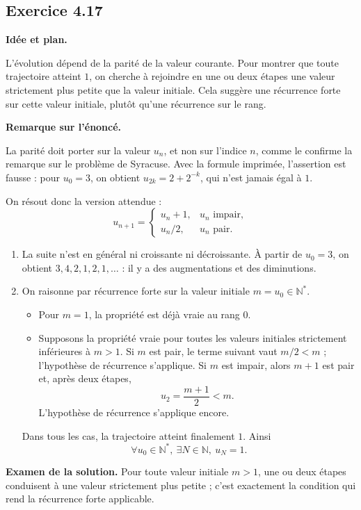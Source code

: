 \documentclass[11pt,a4paper]{article}
\newcommand{\N}{\mathbb N}
\newcommand{\1}{\mathbf 1}
\newenvironment{corrige}[1]{%
  \Needspace{5\baselineskip}%
  \subsection*{Exercice #1}%
  \addcontentsline{toc}{subsection}{Exercice #1}%
}{\medskip}
\newenvironment{coquille}{%
  \begin{center}\begin{minipage}{0.94\linewidth}
  \color{MATred}\textbf{Remarque sur l'énoncé.}\enspace
}{%
  \end{minipage}\end{center}
}
\newenvironment{methode}{%
  \begin{center}\begin{minipage}{0.94\linewidth}
  \color{MATblue}\textbf{Idée et plan.}\enspace
}{%
  \end{minipage}\end{center}
}
\begin{document}
\begin{corrige}{4.17}
\begin{methode}
L'évolution dépend de la parité de la valeur courante. Pour montrer que toute trajectoire atteint $1$, on cherche à rejoindre en une ou deux étapes une valeur strictement plus petite que la valeur initiale. Cela suggère une récurrence forte sur cette valeur initiale, plutôt qu'une récurrence sur le rang.
\end{methode}
\begin{coquille}
La parité doit porter sur la valeur $u_n$, et non sur l'indice $n$, comme le confirme la remarque sur le problème de Syracuse. Avec la formule imprimée, l'assertion est fausse : pour $u_0=3$, on obtient $u_{2k}=2+2^{-k}$, qui n'est jamais égal à $1$.
\end{coquille}
On résout donc la version attendue :
\[
u_{n+1}=
\begin{cases}
u_n+1,&u_n\text{ impair},\\
u_n/2,&u_n\text{ pair}.
\end{cases}
\]
\begin{enumerate}
  \item La suite n'est en général ni croissante ni décroissante. À partir de $u_0=3$, on obtient $3,4,2,1,2,1,\ldots$ : il y a des augmentations et des diminutions.

  \item On raisonne par récurrence forte sur la valeur initiale $m=u_0\in\N^*$.
  \begin{itemize}
    \item Pour $m=1$, la propriété est déjà vraie au rang $0$.
    \item Supposons la propriété vraie pour toutes les valeurs initiales strictement inférieures à $m>1$.
      Si $m$ est pair, le terme suivant vaut $m/2<m$ ; l'hypothèse de récurrence s'applique.
      Si $m$ est impair, alors $m+1$ est pair et, après deux étapes,
      \[
      u_2=\frac{m+1}{2}<m.
      \]
      L'hypothèse de récurrence s'applique encore.
  \end{itemize}
  Dans tous les cas, la trajectoire atteint finalement $1$. Ainsi
  \[
  \boxed{\forall u_0\in\N^*,\ \exists N\in\N,\ u_N=1}.
  \]
\end{enumerate}
\textbf{Examen de la solution.} Pour toute valeur initiale $m>1$, une ou deux étapes conduisent à une valeur strictement plus petite ; c'est exactement la condition qui rend la récurrence forte applicable.
\end{corrige}
\end{document}
